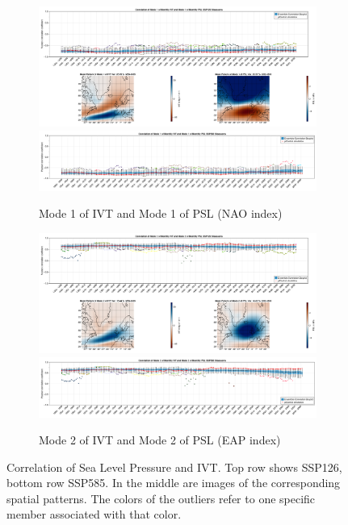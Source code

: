 \begin{figure}[!tbp]
  \begin{subfigure}[b]{0.49\textwidth}
        \includegraphics[width=\textwidth]{figures/correlation_boxplot_ivt_psl_modes11_ssp126_50seasons.png}
        \includegraphics[width=\textwidth]{figures/correlation_boxplot_ivt_psl_modes11_ssp585_50seasons.png}
    \caption{Mode 1 of IVT and Mode 1 of PSL (NAO index)}
    \label{fig:cor ivt psl modes11}
  \end{subfigure}
  \hfill
  \begin{subfigure}[b]{0.49\textwidth}
        \includegraphics[width=\textwidth]{figures/correlation_boxplot_ivt_psl_modes22_ssp126_50seasons.png}
        \includegraphics[width=\textwidth]{figures/correlation_boxplot_ivt_psl_modes22_ssp585_50seasons.png}
    \caption{Mode 2 of IVT and Mode 2 of PSL (EAP index)}
    \label{fig:cor ivt psl modes22}
  \end{subfigure}
  \caption{Correlation of Sea Level Pressure and IVT. Top row shows SSP126, bottom row SSP585. In the middle are images of the corresponding spatial patterns. The colors of the outliers refer to one specific member associated with that color.}
\end{figure}

